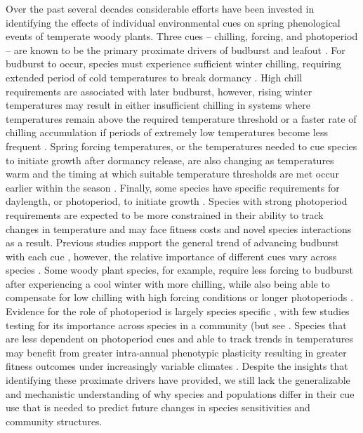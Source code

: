\documentclass{article}\usepackage[]{graphicx}\usepackage[]{color}
\begin{document}
Over the past several decades considerable efforts have been invested in identifying the effects of individual environmental cues on spring phenological events of temperate woody plants. Three cues -- chilling, forcing, and photoperiod -- are known to be the primary proximate drivers of budburst and leafout \citep{Chuine2016}. For budburst to occur, species must experience sufficient winter chilling, requiring extended period of cold temperatures to break dormancy \citep{Cooke2012, Ritchie2003}. High chill requirements are associated with later budburst, however, rising winter temperatures may result in either insufficient chilling in systems where temperatures remain above the required temperature threshold or a faster rate of chilling accumulation if periods of extremely low temperatures become less frequent \citep{Guy2014}. Spring forcing temperatures, or the temperatures needed to cue species to initiate growth after dormancy release, are also changing as temperatures warm and the timing at which suitable temperature thresholds are met occur earlier within the season \citep{citation}. Finally, some species have specific requirements for daylength, or photoperiod, to initiate growth \citep{BaslerKoner2014, Zohner2020}. Species with strong photoperiod requirements are expected to be more constrained in their ability to track changes in temperature and may face fitness costs and novel species interactions as a result. Previous studies support the general trend of advancing budburst with each cue \citep{Flynn2018}, however, the relative importance of different cues vary across species \citep{Chuine2016?, Flynn2018, citations?}. Some woody plant species, for example, require less forcing to budburst after experiencing a cool winter with more chilling, while also being able to compensate for low chilling with high forcing conditions or longer photoperiods \citep{Laube2014, Harrington2015, Flynn2018,  Caffarra2011, Basler2014,  Zohner2016}. Evidence for the role of photoperiod is largely species specific  \citep{Heide1993, Basler2014, Singh2017, Zohner2016}, with few studies testing for its importance across species in a community (but see  \citep{Flynn2018}. Species that are less dependent on photoperiod cues and able to track trends in temperatures may benefit from greater intra-annual phenotypic plasticity resulting in greater fitness outcomes under increasingly variable climates \citep{citation}. Despite the insights that identifying these proximate drivers have provided, we still lack the generalizable and mechanistic understanding of why species and populations differ in their cue use that is needed to predict future changes in species sensitivities and community structures.
\end{document}

